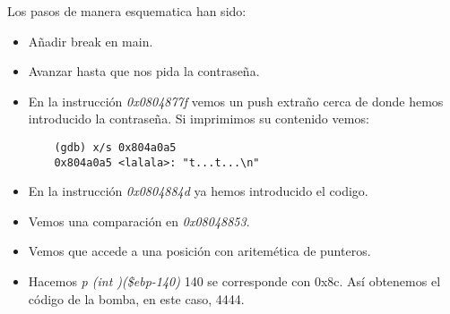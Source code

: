 \documentclass{article}
\newcommand{\n}[1]{{\color{gray}#1}}
\begin{document}
Los pasos de manera esquematica han sido:

\begin{itemize}
\item Añadir break en main.
\item Avanzar hasta que nos pida la contraseña.
\item En la instrucción \textit{0x0804877f} vemos un push extraño
  cerca de donde hemos introducido la contraseña. Si imprimimos su contenido vemos:

  \begin{lstlisting}
    (gdb) x/s 0x804a0a5
    0x804a0a5 <lalala>: "t...t...\n"
  \end{lstlisting}


\item En la instrucción \textit{0x0804884d} ya hemos introducido el codigo.
\item Vemos una comparación en \textit{0x08048853}.
\item Vemos que accede a una posición con aritemética de punteros.
\item Hacemos \textit{p \*(int \*)(\$ebp-140)} 140 se corresponde con
  0x8c. Así obtenemos el código de la bomba, en este caso, 4444.
\end{itemize}
\end{document}
